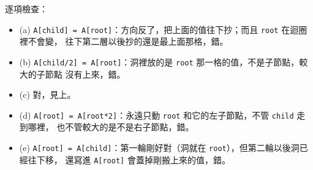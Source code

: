 \begin{pastsoln}
逐項檢查：
\begin{itemize}
\item (a) \texttt{A[child] = A[root]}：方向反了，把上面的值往下抄；而且 \texttt{root} 在迴圈裡不會變，
往下第二層以後抄的還是最上面那格，錯。
\item (b) \texttt{A[child/2] = A[root]}：洞裡放的是 \texttt{root} 那一格的值，不是子節點，較大的子節點
沒有上來，錯。
\item (c) 對，見上。
\item (d) \texttt{A[root] = A[root*2]}：永遠只動 \texttt{root} 和它的左子節點，不管 \texttt{child} 走到哪裡，
也不管較大的是不是右子節點，錯。
\item (e) \texttt{A[root] = A[child]}：第一輪剛好對（洞就在 \texttt{root}），但第二輪以後洞已經往下移，
還寫進 \texttt{A[root]} 會蓋掉剛搬上來的值，錯。
\end{itemize}
\end{pastsoln}
